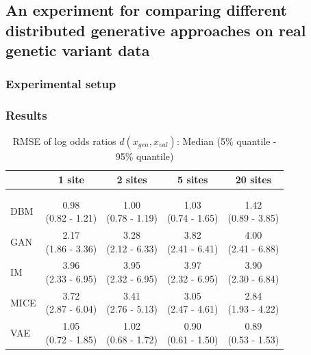 \documentclass[12pt]{article}
\begin{document}
\subsection{An experiment for comparing different distributed generative approaches on real genetic variant data}


\subsubsection{Experimental setup}

\subsubsection{Results}

\begin{table}[h!]
\centering
\begin{tabular}{l|cccc}
& 1 site & 2 sites & 5 sites & 20 sites \\[0.5ex]
\hline
\\\\[-4\medskipamount]
DBM & \makecell{0.98 \\ (0.82 - 1.21)} & \makecell{1.00 \\ (0.78 - 1.19)} & \makecell{1.03 \\ (0.74 - 1.65)} & \makecell{1.42 \\ (0.89 - 3.85)} \\[2ex]
GAN & \makecell{2.17 \\ (1.86 - 3.36)} & \makecell{3.28 \\ (2.12 - 6.33)} & \makecell{3.82 \\ (2.41 - 6.41)} & \makecell{4.00 \\ (2.41 - 6.88)} \\[2ex]
IM & \makecell{3.96 \\ (2.33 - 6.95)} & \makecell{3.95 \\ (2.32 - 6.95)} & \makecell{3.97 \\ (2.32 - 6.95)} & \makecell{3.90 \\ (2.30 - 6.84)} \\[2ex]
MICE & \makecell{3.72 \\ (2.87 - 6.04)} & \makecell{3.41 \\ (2.76 - 5.13)} & \makecell{3.05 \\ (2.47 - 4.61)} & \makecell{2.84 \\ (1.93 - 4.22)} \\[2ex]
VAE & \makecell{1.05 \\ (0.72 - 1.85)} & \makecell{1.02 \\ (0.68 - 1.72)} & \makecell{0.90 \\ (0.61 - 1.50)} & \makecell{0.89 \\ (0.53 - 1.53)} \\[2ex]
\end{tabular}
\caption{RMSE of log odds ratios $d(x_{gen},x_{val})$: Median (5\% quantile - 95\% quantile)}
\label{tab:distgenresults_rmse}
\end{table}
\end{document}
